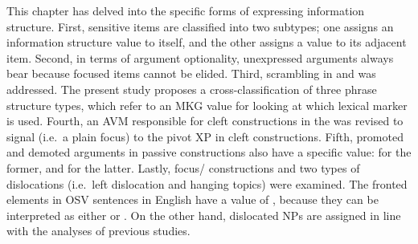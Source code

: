 This chapter has delved into the specific forms of expressing
information structure. First,  sensitive items are
classified into two subtypes; one assigns an
information structure value to itself, and the other assigns a value
to its adjacent item.  Second, in terms of argument
optionality, unexpressed arguments always
bear  because focused items cannot be elided. Third,
scrambling in  and  was addressed. The
present study proposes a cross-classification of three phrase
structure types, which refer to an MKG value for looking at which
lexical marker is used. Fourth, an AVM
responsible for cleft constructions in the  was revised to
signal  (i.e.\ a plain focus) to the pivot XP in cleft
constructions.  Fifth, promoted and demoted arguments in passive
constructions also have a specific 
value:  for the former, and
 for the latter.  Lastly, focus/
 constructions and two types of dislocations
(i.e.\ left dislocation and hanging topics) were
examined. The fronted elements in OSV sentences in English have a
value of , because they can be interpreted as
either  or . On the
other hand, dislocated NPs are assigned  in line
with the analyses of previous studies.



